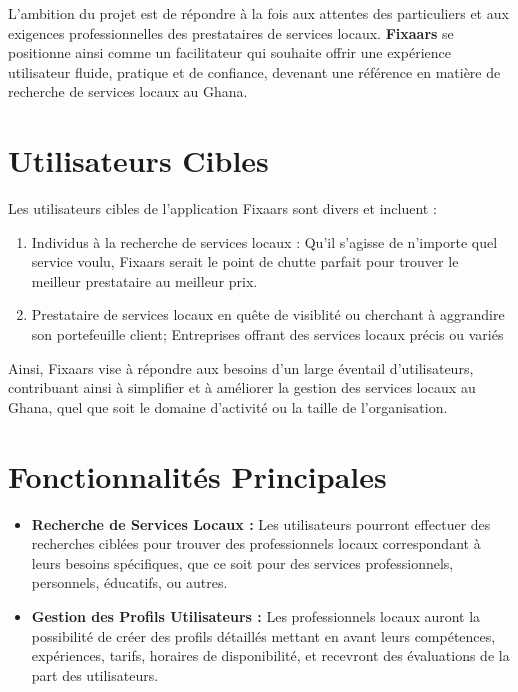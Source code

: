 {\vspace{0.35cm}

L'ambition du projet est de répondre à la fois aux attentes des particuliers et aux exigences professionnelles des prestataires de services locaux. \textbf{Fixaars} se positionne ainsi comme un facilitateur qui souhaite offrir une expérience utilisateur fluide, pratique et de confiance, devenant une référence en matière de recherche de services locaux au Ghana.

\section{Utilisateurs Cibles}

Les utilisateurs cibles de l'application Fixaars sont divers et incluent :

\begin{enumerate}

    \item Individus à la recherche de services locaux : Qu'il s'agisse de n'importe quel service voulu, Fixaars serait le point de chutte parfait pour trouver le meilleur prestataire au meilleur prix.

    \item Prestataire de services locaux en quête de visiblité ou cherchant à aggrandire son portefeuille client; Entreprises offrant des services locaux précis ou variés 
    
\end{enumerate}

Ainsi, Fixaars vise à répondre aux besoins d'un large éventail d'utilisateurs, contribuant ainsi à simplifier et à améliorer la gestion des services locaux au Ghana, quel que soit le domaine d'activité ou la taille de l'organisation.

\section{Fonctionnalités Principales}

\begin{itemize}
    \item \textbf{Recherche de Services Locaux :} Les utilisateurs pourront effectuer des recherches ciblées pour trouver des professionnels locaux correspondant à leurs besoins spécifiques, que ce soit pour des services professionnels, personnels, éducatifs, ou autres.

    \item \textbf{Gestion des Profils Utilisateurs :} Les professionnels locaux auront la possibilité de créer des profils détaillés mettant en avant leurs compétences, expériences, tarifs, horaires de disponibilité, et recevront des évaluations de la part des utilisateurs.


\end{itemize}}
